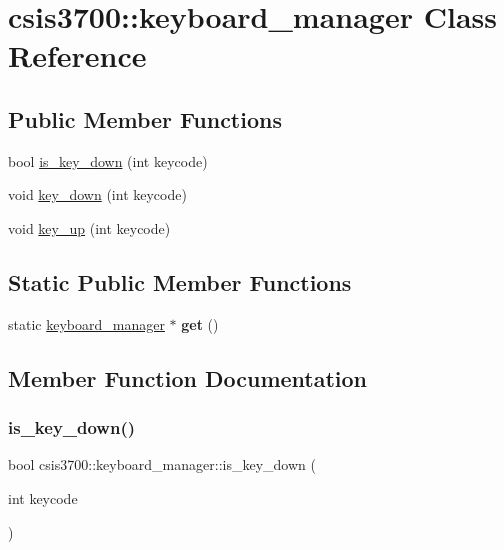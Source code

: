 \hypertarget{classcsis3700_1_1keyboard__manager}{}\section{csis3700\+:\+:keyboard\+\_\+manager Class Reference}
\label{classcsis3700_1_1keyboard__manager}
\subsection*{Public Member Functions}
\begin{DoxyCompactItemize}
\item 
bool \hyperlink{classcsis3700_1_1keyboard__manager_a6171a0c3677e5e08ddff2bf48b65755d}{is\+\_\+key\+\_\+down} (int keycode)
\item 
void \hyperlink{classcsis3700_1_1keyboard__manager_aae677b5185c2d235b589767c4e3e6098}{key\+\_\+down} (int keycode)
\item 
void \hyperlink{classcsis3700_1_1keyboard__manager_a970b26d49eb327f582ac28ac6caa0f36}{key\+\_\+up} (int keycode)
\end{DoxyCompactItemize}
\subsection*{Static Public Member Functions}
\begin{DoxyCompactItemize}
\item 
\mbox{\label{classcsis3700_1_1keyboard__manager_a4324b77d38224e21e3baaa8655c2641f}} 
static \hyperlink{classcsis3700_1_1keyboard__manager}{keyboard\+\_\+manager} $\ast$ {\bfseries get} ()
\end{DoxyCompactItemize}


\subsection{Member Function Documentation}
\mbox{\label{classcsis3700_1_1keyboard__manager_a6171a0c3677e5e08ddff2bf48b65755d}} 
\subsubsection{\texorpdfstring{is\+\_\+key\+\_\+down()}{is\_key\_down()}}
{\footnotesize\ttfamily bool csis3700\+::keyboard\+\_\+manager\+::is\+\_\+key\+\_\+down (\begin{DoxyParamCaption}\item[{int}]{keycode }\end{DoxyParamCaption})}

